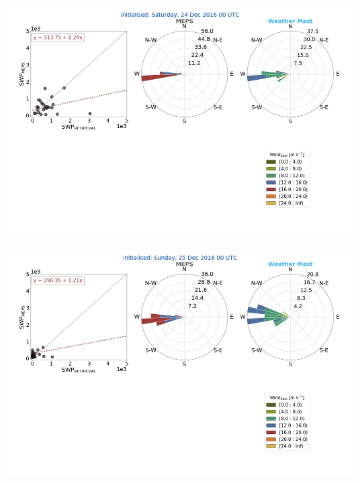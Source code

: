 \begin{figure}\ContinuedFloat
	\begin{subfigure}[b]{0.84\textwidth}
		\includegraphics[trim={2.3cm 19.5cm 2.cm .7cm},clip,width=\textwidth]{./fig_windrose/20161224}
		\caption{}\label{fig:wind24}
	\end{subfigure}
	\newline
	\centering
	\begin{subfigure}[b]{0.84\textwidth}
		\includegraphics[trim={2.3cm 19.5cm 2.cm .7cm},clip,width=\textwidth]{./fig_windrose/20161225}
		\caption{}\label{fig:wind25}
	\end{subfigure}

\end{figure}
